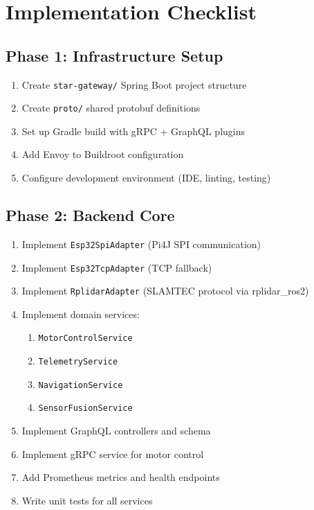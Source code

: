 \section{Implementation Checklist}

\subsection{Phase 1: Infrastructure Setup}

\begin{enumerate}
    \item[$\square$] Create \texttt{star-gateway/} Spring Boot project structure
    \item[$\square$] Create \texttt{proto/} shared protobuf definitions
    \item[$\square$] Set up Gradle build with gRPC + GraphQL plugins
    \item[$\square$] Add Envoy to Buildroot configuration
    \item[$\square$] Configure development environment (IDE, linting, testing)
\end{enumerate}

\subsection{Phase 2: Backend Core}

\begin{enumerate}
    \item[$\square$] Implement \texttt{Esp32SpiAdapter} (Pi4J SPI communication)
    \item[$\square$] Implement \texttt{Esp32TcpAdapter} (TCP fallback)
    \item[$\square$] Implement \texttt{RplidarAdapter} (SLAMTEC protocol via rplidar\_ros2)
    \item[$\square$] Implement domain services:
    \begin{enumerate}
        \item[$\square$] \texttt{MotorControlService}
        \item[$\square$] \texttt{TelemetryService}
        \item[$\square$] \texttt{NavigationService}
        \item[$\square$] \texttt{SensorFusionService}
    \end{enumerate}
    \item[$\square$] Implement GraphQL controllers and schema
    \item[$\square$] Implement gRPC service for motor control
    \item[$\square$] Add Prometheus metrics and health endpoints
    \item[$\square$] Write unit tests for all services
\end{enumerate}

